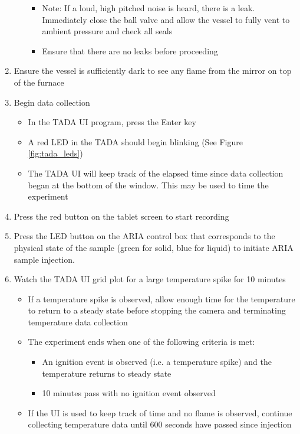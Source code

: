 \documentclass[letterpaper,11pt]{article}
\begin{document}
\begin{enumerate}
\begin{itemize}
        \begin{itemize}
            \item Note: If a loud, high pitched noise is heard, there is a 
                leak. Immediately close the ball valve and allow the vessel to 
                fully vent to ambient pressure and check all seals
            \item Ensure that there are no leaks before proceeding
            \end{itemize}
        \end{itemize} 

    \item Ensure the vessel is sufficiently dark to see any 
        flame from the mirror on top of the furnace
    
    \item Begin data collection 
        \begin{itemize}
        \item In the TADA UI program, press the Enter key
        \item A red LED in the TADA should begin blinking (See 
            Figure \ref{fig:tada_leds})
        \item The TADA UI will keep track of the elapsed time since data 
          collection began at the bottom of the window. This may be used
          to time the experiment
        \end{itemize}
    
    \item Press the red button on the tablet 
        screen to start recording
        
    \item Press the LED button on the ARIA control box that corresponds to the 
        physical state of the sample
        (green for solid, blue for liquid) to initiate ARIA sample injection.
            
    \item Watch the TADA UI grid plot for a large temperature spike for 10 minutes
        \begin{itemize}
        \item If a temperature spike is observed, allow enough time for the
            temperature to return to a steady state before stopping the camera 
            and terminating temperature data collection
        
        \item The experiment ends when one of the following criteria is met:
            \begin{itemize} 
            \item An ignition event is observed (i.e. a temperature spike) 
                and the temperature returns to steady state
            \item 10 minutes pass with no ignition event observed
            \end{itemize}
        \item If the UI is used to keep track of time and no flame is observed, 
            continue collecting temperature data until 600 seconds have passed 
            since injection
        \end{itemize}
    

\end{enumerate}
\end{document}
